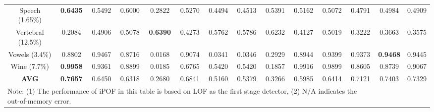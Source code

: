 \documentclass[sigconf,nonacm]{acmart}
\begin{document}
\begin{table*}[h!]
{\begin{tabular}{|p{5cm}||p{5cm}|p{5cm}|p{5cm}|p{5cm}|p{5cm}|p{5cm}|p{5cm}|p{5cm}|p{5cm}|p{5cm}|p{5cm}|p{5cm}|p{5cm}}
    \multicolumn{1}{c||}{Speech (1.65\%)} & \multicolumn{1}{c|}{\textbf{0.6435}} & \multicolumn{1}{c}{0.5492} & \multicolumn{1}{c}{0.6000} &   \multicolumn{1}{c}{0.2822} & \multicolumn{1}{c|}{0.5270} & \multicolumn{1}{c}{0.4494} & \multicolumn{1}{c||}{0.4513} & \multicolumn{1}{c}{0.5391} & \multicolumn{1}{c}{0.5162} & \multicolumn{1}{c}{0.5072} & \multicolumn{1}{c}{0.4791} & \multicolumn{1}{c}{0.4984} & \multicolumn{1}{c}{0.4909}\\
    
    \multicolumn{1}{c||}{Vertebral (12.5\%)} & \multicolumn{1}{c|}{0.2084} & \multicolumn{1}{c}{0.4906} & \multicolumn{1}{c}{0.5078} &   \multicolumn{1}{c}{\textbf{0.6390}} & \multicolumn{1}{c|}{0.4273} & \multicolumn{1}{c}{0.5762} & \multicolumn{1}{c||}{0.5786} & \multicolumn{1}{c}{0.6232} & \multicolumn{1}{c}{0.4127} & \multicolumn{1}{c}{0.5019} & \multicolumn{1}{c}{0.3222} & \multicolumn{1}{c}{0.3663} & \multicolumn{1}{c}{0.3575}\\
    
    \multicolumn{1}{c||}{Vowels (3.4\%)} & \multicolumn{1}{c|}{0.8802} & \multicolumn{1}{c}{{0.9467}} & \multicolumn{1}{c}{0.8716} &   \multicolumn{1}{c}{0.0168} & \multicolumn{1}{c|}{0.9074} & \multicolumn{1}{c}{0.0341} & \multicolumn{1}{c||}{0.0346} & \multicolumn{1}{c}{0.2929} & \multicolumn{1}{c}{0.8944} & \multicolumn{1}{c}{0.9399} & \multicolumn{1}{c}{0.9373} & \multicolumn{1}{c}{\textbf{0.9468}} & \multicolumn{1}{c}{0.9445}\\
    
    \multicolumn{1}{c||}{Wine (7.7\%)} & \multicolumn{1}{c|}{\textbf{0.9958}} & \multicolumn{1}{c}{0.9361} & \multicolumn{1}{c}{0.8899} &   \multicolumn{1}{c}{0.0185} & \multicolumn{1}{c|}{0.6765} & \multicolumn{1}{c}{0.5420} & \multicolumn{1}{c||}{0.5420} & \multicolumn{1}{c}{0.1857} & \multicolumn{1}{c}{0.9916} & \multicolumn{1}{c}{0.9899} & \multicolumn{1}{c}{0.8605} & \multicolumn{1}{c}{0.8739} & \multicolumn{1}{c}{0.9067}\\
    \hline
    \multicolumn{1}{c||}{\textbf{AVG}} & \multicolumn{1}{c|}{\textbf{0.7657}} & \multicolumn{1}{c}{0.6450} & \multicolumn{1}{c}{0.6318} &   \multicolumn{1}{c}{0.2680} & \multicolumn{1}{c|}{0.6841} & \multicolumn{1}{c}{0.5160} & \multicolumn{1}{c||}{0.5379} & \multicolumn{1}{c}{0.3266} & \multicolumn{1}{c}{0.5985} & \multicolumn{1}{c}{0.6414} & \multicolumn{1}{c}{0.7121} & \multicolumn{1}{c}{0.7403} & \multicolumn{1}{c}{0.7329}\\
    \hline
    \multicolumn{12}{l}{Note: (1) The performance of iPOF in this table is based on LOF as the first stage detector, (2) N/A indicates the out-of-memory error.  }\\
    \end{tabular}}\label{tab:performance}
\end{table*}
\end{document}
